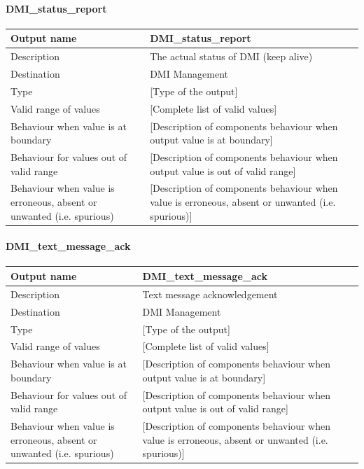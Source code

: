 \paragraph{DMI\_status\_report}

\begin{longtable}{p{}p{}}
\toprule
Output name				& DMI\_status\_report \\
\midrule
Description				& The actual status of DMI (keep alive) \\
\midrule
Destination				& DMI Management \\ 
\midrule
Type					& [Type of the output] \\
\midrule
Valid range of values	& [Complete list of valid values] \\
\midrule
Behaviour when value is at boundary	& [Description of components behaviour when output value is at boundary] \\
\midrule
Behaviour for values out of valid range	& [Description of components behaviour when output value is out of valid range] \\
\midrule
Behaviour when value is erroneous, absent or unwanted (i.e. spurious) & [Description of components behaviour when value is erroneous, absent or unwanted (i.e. spurious)] \\
\bottomrule
\end{longtable}


\paragraph{DMI\_text\_message\_ack}

\begin{longtable}{p{}p{}}
\toprule
Output name				& DMI\_text\_message\_ack \\
\midrule
Description				& Text message acknowledgement \\
\midrule
Destination				& DMI Management \\ 
\midrule
Type					& [Type of the output] \\
\midrule
Valid range of values	& [Complete list of valid values] \\
\midrule
Behaviour when value is at boundary	& [Description of components behaviour when output value is at boundary] \\
\midrule
Behaviour for values out of valid range	& [Description of components behaviour when output value is out of valid range] \\
\midrule
Behaviour when value is erroneous, absent or unwanted (i.e. spurious) & [Description of components behaviour when value is erroneous, absent or unwanted (i.e. spurious)] \\
\bottomrule
\end{longtable}


